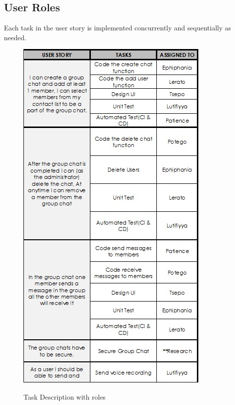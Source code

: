 \documentclass[a4paper]{article}
\begin{document}
\subsection{User Roles}
Each task in the user story is implemented concurrently and sequentially as needed.
\begin{figure}[H]
\includegraphics[width=0.8\linewidth]{./pictures/role.jpg}\\
\caption{\label{fig:Task Discription with roles}Task Description with roles}
\end{figure}
\end{document}
